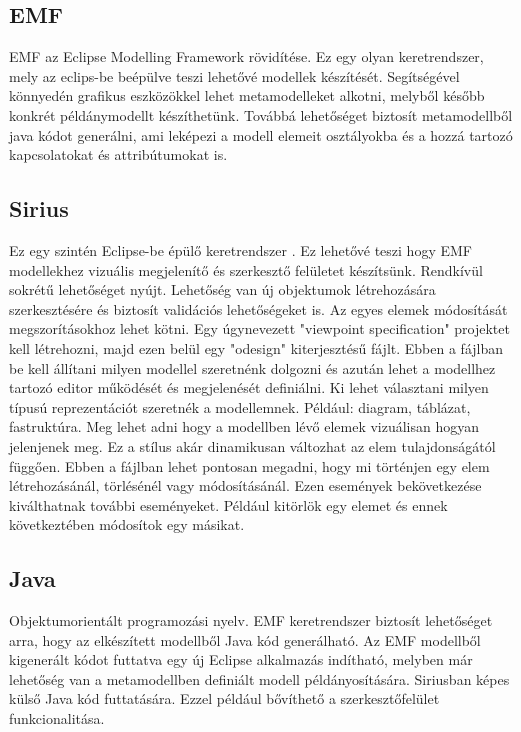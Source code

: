\subsection{EMF}
\nocite{EMFtut}
EMF az Eclipse Modelling Framework \cite{EMF} rövidítése. Ez egy olyan keretrendszer, mely az eclips-be beépülve teszi lehetővé modellek készítését. Segítségével könnyedén grafikus eszközökkel lehet metamodelleket alkotni, melyből később konkrét példánymodellt készíthetünk. Továbbá lehetőséget biztosít metamodellből java kódot generálni, ami leképezi a modell elemeit osztályokba és a hozzá tartozó kapcsolatokat és attribútumokat is.

\subsection{Sirius}
\nocite{SiruisTutNagyASz}
\nocite{SiruisTutStart}
\nocite{SiruisTutAdv}
Ez egy szintén Eclipse-be épülő keretrendszer \cite{Sirius}. Ez lehetővé teszi hogy EMF modellekhez vizuális megjelenítő és szerkesztő felületet készítsünk. Rendkívül sokrétű lehetőséget nyújt. Lehetőség van új objektumok létrehozására szerkesztésére és biztosít validációs lehetőségeket is. Az egyes elemek módosítását megszorításokhoz lehet kötni. Egy úgynevezett "viewpoint specification" projektet kell létrehozni, majd ezen belül egy "odesign" kiterjesztésű fájlt. Ebben a fájlban be kell állítani milyen modellel szeretnénk dolgozni és azután lehet a modellhez tartozó editor működését és megjelenését definiálni. Ki lehet választani milyen típusú reprezentációt szeretnék a modellemnek. Például: diagram, táblázat, fastruktúra. Meg lehet adni hogy a modellben lévő elemek vizuálisan hogyan jelenjenek meg. Ez a stílus akár dinamikusan változhat az elem tulajdonságától függően. Ebben a fájlban lehet pontosan megadni, hogy mi történjen egy elem létrehozásánál, törlésénél vagy módosításánál. Ezen események bekövetkezése kiválthatnak további eseményeket. Például kitörlök egy elemet és ennek következtében módosítok egy másikat.

\subsection{Java}
Objektumorientált programozási nyelv. EMF keretrendszer biztosít lehetőséget arra, hogy az elkészített modellből Java kód generálható. Az EMF modellből kigenerált kódot futtatva egy új Eclipse alkalmazás indítható, melyben már lehetőség van a metamodellben definiált modell példányosítására. Siriusban képes külső Java kód futtatására. Ezzel például bővíthető a szerkesztőfelület funkcionalitása.

